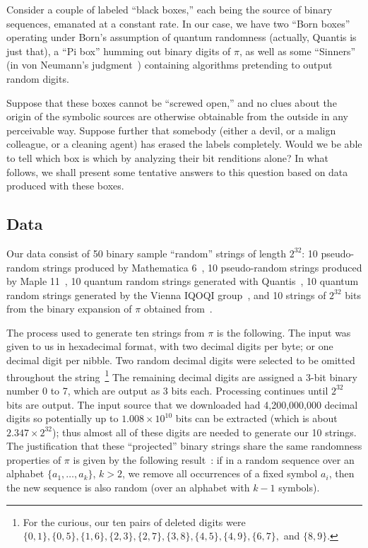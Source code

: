 \documentclass[10pt]{article}%
\begin{document}
Consider a couple of labeled ``black boxes,'' each being the source
of binary sequences, emanated at a constant rate.
In our case, we have two ``Born boxes'' operating under Born's
assumption of quantum randomness (actually, Quantis is just that),
a ``Pi box'' humming out binary digits of $\pi$, as well as some
``Sinners'' (in von Neumann's judgment~\cite{von-neumann1})
containing algorithms pretending to
output random digits.

Suppose that these boxes cannot be ``screwed open,'' and no clues
about the origin of the symbolic sources are otherwise obtainable
from the outside in any perceivable way.
Suppose further that somebody (either a devil, or a malign colleague,
or a cleaning agent) has erased the labels completely.
Would we be able to tell which box is which by analyzing their bit
renditions alone?
In what follows, we shall present some tentative answers to this question
based on data produced with these boxes.


 \subsection{Data}
Our data consist of 50 binary sample ``random'' strings  of length
$2^{32}$: 10 pseudo-random strings  produced by Mathematica 6~\cite{MRG},
10 pseudo-random strings  produced by  Maple 11~\cite{MAPLE}, 10 quantum random strings
generated with  Quantis~\cite{Quantis}, 10 quantum random strings
generated by the Vienna IQOQI group~\cite{Vienna},
and  10 strings of $2^{32}$ bits from the binary expansion of $\pi$ obtained from~\cite{pi}.

The process used to generate ten strings from $\pi$ is the following.   The input was given
to us in hexadecimal format, with two decimal digits per byte; or one decimal digit per nibble.
Two random decimal digits were selected to be omitted throughout the string~\footnote{For the curious, our ten pairs
of deleted digits were $\{0,1\},\{0,5\},\{1,6\},\{2,3\},\{2,7\},\{3,8\},\{4,5\},\{4,9\},\{6,7\},$
and $\{8,9\}$.} The remaining decimal digits are assigned a 3-bit binary number 0 to 7,
which are output as 3 bits each.
Processing continues until $2^{32}$  bits are output.
The input source that we downloaded had 4,200,000,000 decimal digits so potentially up to
$1.008\times 10^{10}$ bits can be extracted (which is about $2.347 \times 2^{32}$);
thus
almost all of these digits are needed to generate our 10 strings. The
justification that these ``projected'' binary strings share the same randomness properties of
$\pi$ is given by the following result~\cite{calude:02}: if in a random sequence over an alphabet $\{a_{1}, \ldots , a_{k}\}$, $k>2$, we remove all occurrences of a
fixed symbol $a_{i}$, then the new sequence is also random (over
an alphabet with $k-1$ symbols).
\end{document}
